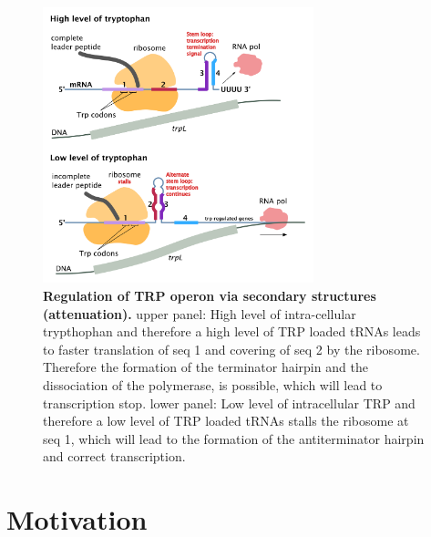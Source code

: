 \documentclass[ twoside,openright,titlepage,numbers=noenddot,headinclude,%
                footinclude=false, cleardoublepage=empty,abstractoff, %
                BCOR=5mm,paper=a4,fontsize=11pt,%
                ngerman,american,%
                ]{scrreprt}
\begin{document}
\begin{figure}
  \begin{center}
\includegraphics[width=0.7\textwidth]{./pictures/Discussion_results/TRP/trp_operon_attenuation.png}
  \end{center}
\caption{{\bf Regulation of TRP operon via secondary structures (attenuation).} 
upper panel: High level of intra-cellular trypthophan and therefore a high level of TRP loaded tRNAs leads to faster translation of seq 1 and covering of seq 2 by the ribosome. Therefore the formation of the terminator hairpin and the dissociation of the polymerase, is possible, which will lead to transcription stop. 
  lower panel: Low level of intracellular TRP and therefore a low level of TRP loaded tRNAs stalls the ribosome at seq 1, which will lead to the formation of the antiterminator hairpin and correct transcription. }
\label{fig:trp_operon_attenuation}
\end{figure}


\FloatBarrier

\section{Motivation}

\end{document}
